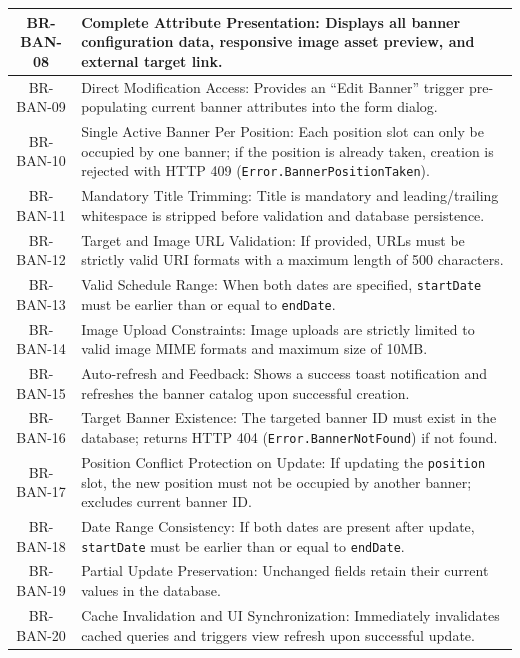 \begin{longtable}{|c|p{12cm}|}
    BR-BAN-08 & Complete Attribute Presentation: Displays all banner configuration data, responsive image asset preview, and external target link. \\ \hline
    BR-BAN-09 & Direct Modification Access: Provides an ``Edit Banner'' trigger pre-populating current banner attributes into the form dialog. \\ \hline
    BR-BAN-10 & Single Active Banner Per Position: Each position slot can only be occupied by one banner; if the position is already taken, creation is rejected with HTTP 409 (\texttt{Error.\allowbreak Banner\allowbreak Position\allowbreak Taken}). \\ \hline
    BR-BAN-11 & Mandatory Title Trimming: Title is mandatory and leading/trailing whitespace is stripped before validation and database persistence. \\ \hline
    BR-BAN-12 & Target and Image URL Validation: If provided, URLs must be strictly valid URI formats with a maximum length of 500 characters. \\ \hline
    BR-BAN-13 & Valid Schedule Range: When both dates are specified, \texttt{startDate} must be earlier than or equal to \texttt{endDate}. \\ \hline
    BR-BAN-14 & Image Upload Constraints: Image uploads are strictly limited to valid image MIME formats and maximum size of 10MB. \\ \hline
    BR-BAN-15 & Auto-refresh and Feedback: Shows a success toast notification and refreshes the banner catalog upon successful creation. \\ \hline
    BR-BAN-16 & Target Banner Existence: The targeted banner ID must exist in the database; returns HTTP 404 (\texttt{Error.\allowbreak Banner\allowbreak Not\allowbreak Found}) if not found. \\ \hline
    BR-BAN-17 & Position Conflict Protection on Update: If updating the \texttt{position} slot, the new position must not be occupied by another banner; excludes current banner ID. \\ \hline
    BR-BAN-18 & Date Range Consistency: If both dates are present after update, \texttt{startDate} must be earlier than or equal to \texttt{endDate}. \\ \hline
    BR-BAN-19 & Partial Update Preservation: Unchanged fields retain their current values in the database. \\ \hline
    BR-BAN-20 & Cache Invalidation and UI Synchronization: Immediately invalidates cached queries and triggers view refresh upon successful update. \\ \hline

\end{longtable}
